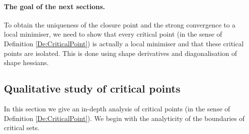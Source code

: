 \documentclass{article}
\numberwithin{equation}{section}
\begin{document}
\paragraph{The goal of the next sections.} To obtain the uniqueness of the closure point and the strong convergence to a local minimiser, we need to show that every critical point (in the sense of Definition \ref{De:CriticalPoint}) is actually a local minimiser and that these critical points are isolated. This is done using shape derivatives and diagonalisation of shape hessians.

\subsection{Qualitative study of critical points}
In this section we give an in-depth analysis of critical points (in the sense of Definition \ref{De:CriticalPoint}). We begin with the analyticity of the boundaries of critical sets.
\end{document}
